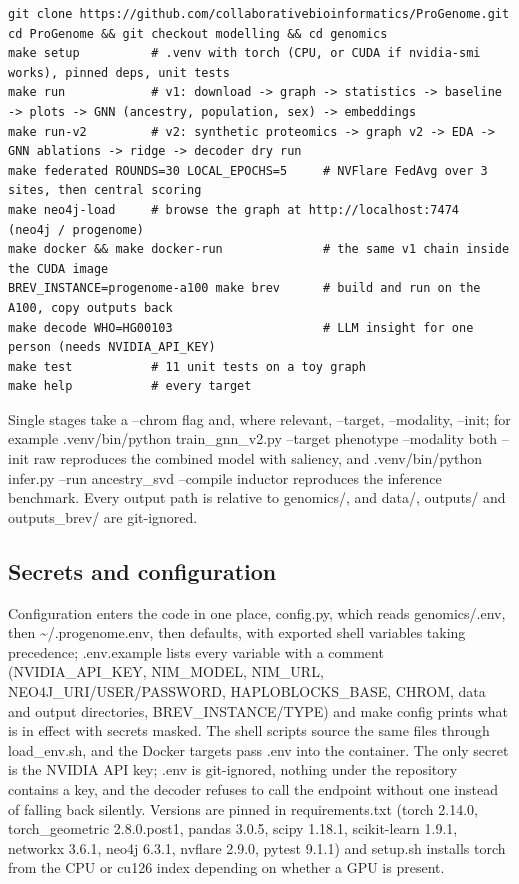\documentclass[11pt,a4paper]{article}
\begin{document}
\begin{small}\begin{verbatim}
git clone https://github.com/collaborativebioinformatics/ProGenome.git
cd ProGenome && git checkout modelling && cd genomics
make setup          # .venv with torch (CPU, or CUDA if nvidia-smi works), pinned deps, unit tests
make run            # v1: download -> graph -> statistics -> baseline -> plots -> GNN (ancestry, population, sex) -> embeddings
make run-v2         # v2: synthetic proteomics -> graph v2 -> EDA -> GNN ablations -> ridge -> decoder dry run
make federated ROUNDS=30 LOCAL_EPOCHS=5     # NVFlare FedAvg over 3 sites, then central scoring
make neo4j-load     # browse the graph at http://localhost:7474  (neo4j / progenome)
make docker && make docker-run              # the same v1 chain inside the CUDA image
BREV_INSTANCE=progenome-a100 make brev      # build and run on the A100, copy outputs back
make decode WHO=HG00103                     # LLM insight for one person (needs NVIDIA_API_KEY)
make test           # 11 unit tests on a toy graph
make help           # every target
\end{verbatim}\end{small}

Single stages take a --chrom flag and, where relevant, --target, --modality, --init; for example .venv/bin/python train\_gnn\_v2.py --target phenotype --modality both --init raw reproduces the combined model with saliency, and .venv/bin/python infer.py --run ancestry\_svd --compile inductor reproduces the inference benchmark. Every output path is relative to genomics/, and data/, outputs/ and outputs\_brev/ are git-ignored.

\subsection{Secrets and configuration}

Configuration enters the code in one place, config.py, which reads genomics/.env, then \textasciitilde{}/.progenome.env, then defaults, with exported shell variables taking precedence; .env.example lists every variable with a comment (NVIDIA\_API\_KEY, NIM\_MODEL, NIM\_URL, NEO4J\_URI/USER/PASSWORD, HAPLOBLOCKS\_BASE, CHROM, data and output directories, BREV\_INSTANCE/TYPE) and make config prints what is in effect with secrets masked. The shell scripts source the same files through load\_env.sh, and the Docker targets pass .env into the container. The only secret is the NVIDIA API key; .env is git-ignored, nothing under the repository contains a key, and the decoder refuses to call the endpoint without one instead of falling back silently. Versions are pinned in requirements.txt (torch 2.14.0, torch\_geometric 2.8.0.post1, pandas 3.0.5, scipy 1.18.1, scikit-learn 1.9.1, networkx 3.6.1, neo4j 6.3.1, nvflare 2.9.0, pytest 9.1.1) and setup.sh installs torch from the CPU or cu126 index depending on whether a GPU is present.
\end{document}
